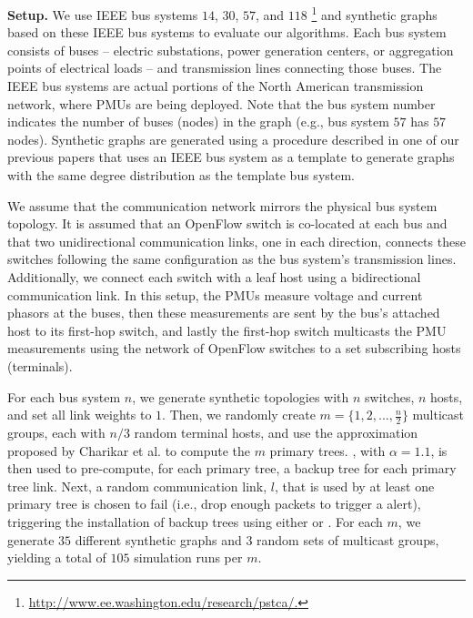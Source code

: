 
{\bf Setup.}
We use IEEE bus systems $14$, $30$, $57$, and $118$ \footnote{\url{http://www.ee.washington.edu/research/pstca/.}}
and synthetic graphs based on these IEEE bus systems to evaluate our algorithms.  Each bus system consists of buses -- electric substations,
power generation centers, or aggregation points of electrical loads -- and transmission lines connecting those buses. The IEEE bus systems are actual portions of the North American
 transmission network, where PMUs are being deployed.  Note that the bus system number indicates the number of buses (nodes) in the graph (e.g., bus system $57$ has $57$ nodes).  
Synthetic graphs are generated using a procedure described in one of our previous papers \cite{Gyllstrom12} that uses an IEEE bus system as a template to generate
graphs with the same degree distribution as the template bus system.  

We assume that the communication network mirrors the physical bus system topology. It is assumed that
an OpenFlow switch is co-located at each bus and that two unidirectional communication links, one in each direction,
connects these switches following the same configuration as the bus system's transmission lines.  Additionally, we connect each switch with a leaf host using a bidirectional communication link.  
In this setup, the PMUs measure voltage and current phasors at the buses, then these measurements are sent by the bus's attached host to its first-hop switch, and lastly 
the first-hop switch multicasts the PMU measurements using the network of OpenFlow switches to a set subscribing hosts (terminals).  

For each bus system $n$, we generate synthetic topologies with $n$ switches, $n$ hosts, and set all link weights to $1$.  Then, we randomly create $m=\{1,2,...,\frac{n}{2}\}$ multicast groups, 
each with $n/3$ random terminal hosts, and use the \arbor approximation proposed by Charikar et al. \cite{Charikar98} to compute the $m$ primary trees. \steiners, with $\alpha=1.1$, is then used
to pre-compute, for each primary tree, a backup tree for each primary tree link.
Next, a random communication link, $l$, that is used by at least one primary tree is chosen to fail (i.e., drop enough packets to trigger a \pcnt alert), 
triggering the installation of backup trees using either \post or \pres.  For each $m$, we generate $35$ different synthetic graphs and $3$ random sets of multicast groups, 
yielding a total of $105$ simulation runs per $m$.  

